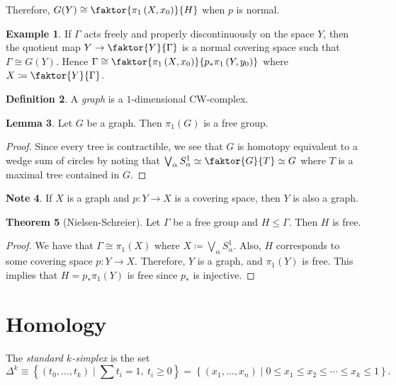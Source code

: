 \documentclass[10pt,letterpaper,cm]{nupset}
\theoremstyle{definition}
\newtheorem{definition}{Definition}[subsection]
\newtheorem{exmp}[definition]{Example}
\newtheorem{note}[definition]{Note}
\theoremstyle{theorem}
\newtheorem{theorem}[definition]{Theorem}
\newtheorem{lemma}[definition]{Lemma}
\theoremstyle{remark}
\newcommand{\1}{\mathbb{1}}
\newcommand{\0}{\vec 0}
\begin{document}
Therefore, $G(Y) \cong \faktor{\pi_1\left(X, x_0\right)}{H}$ when $p$ is normal.

\begin{exmp}
If $\Gamma$ acts freely and properly discontinuously on the space $Y$, then the quotient map $Y \to \faktor{Y}{\Gamma}$ is a normal covering space such that $\Gamma \cong G(Y)$. Hence $\Gamma \cong \faktor{\pi_1\left(X, x_0\right)}{p_{\ast}\pi_1\left(Y, y_0\right)}$ where $X\coloneqq  \faktor{Y}{\Gamma}$.
\end{exmp}

\begin{definition}
A \textit{graph} is a $1$-dimensional CW-complex. 
\end{definition}

\begin{lemma}
Let $G$ be a graph.  Then $\pi_1(G)$ is a free group.
\end{lemma}
\begin{proof}
Since every tree is contractible, we see that $G$ is homotopy equivalent to a wedge sum of circles by noting that $\bigvee_{\alpha} S_{\alpha}^1 \simeq \faktor{G}{T}\simeq G$ where $T$ is a maximal tree contained in $G$. 
\end{proof}

\begin{note}
If $X$ is a graph and $p: Y \to X$ is a covering space, then $Y$ is also a graph. 
\end{note}

\begin{theorem}[Nielsen-Schreier]
Let $\Gamma$ be a free group and $H\leq \Gamma$. Then $H$ is free. 
\end{theorem}
\begin{proof}
We have that $\Gamma \cong \pi_1(X)$ where $X\coloneqq  \bigvee_{\alpha} S_{\alpha}^1$. Also, $H$ corresponds to some covering space $p: Y \to X$. Therefore, $Y$ is a graph, and $\pi_1(Y)$ is free. This implies that $H= p_{\ast}\pi_1(Y)$ is free since $p_{\ast}$ is injective. 
\end{proof}

\section{Homology} 

The \textit{standard $k$-simplex} is the set $$  \Delta^k \equiv \left\{\left(t_0, \ldots, t_k\right) \mid \sum t_i = 1, \ t_i \geq 0 \right\} = \left\{\left(x_1, \ldots, x_n\right) \mid 0\leq x_1 \leq x_2 \leq \cdots \leq x_k \leq 1 \right\} .$$
\end{document}
